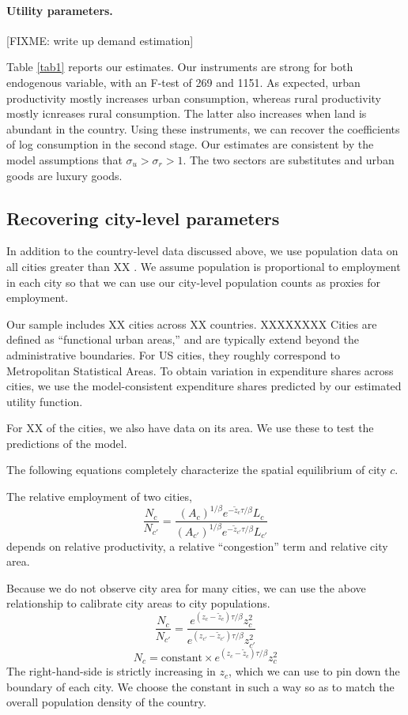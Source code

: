 \documentclass[12pt]{article}
\begin{document}
\paragraph{Utility parameters.}
[FIXME: write up demand estimation]



Table \ref{tab1} reports our estimates. Our instruments are strong for both endogenous variable, with an F-test of 269 and 1151. As expected, urban productivity mostly increases urban consumption, whereas rural productivity mostly icnreases rural consumption. The latter also increases when land is abundant in the country. Using these instruments, we can recover the coefficients of log consumption in the second stage. Our estimates are consistent by the model assumptions that $\sigma_u>\sigma_r>1$. The two sectors are substitutes and urban goods are luxury goods.

\subsection{Recovering city-level parameters}
In addition to the country-level data discussed above, we use population data on all cities greater than XX \cite{}. We assume population is proportional to employment in each city so that we can use our city-level population counts as proxies for employment. 

Our sample includes XX cities across XX countries.
XXXXXXXX Cities are defined as ``functional urban areas,'' and are typically extend beyond the administrative boundaries. For US cities, they roughly correspond to Metropolitan Statistical Areas. To obtain variation in expenditure shares across cities, we use the model-consistent expenditure shares predicted by our estimated utility function.

For XX of the cities, we also have data on its area. We use these to test the predictions of the model.

The following equations completely characterize the spatial equilibrium of city $c$.

The relative employment of two cities,
\[
\frac{N_c}{N_{c'}}
= \frac
	 {\left(A_c\right)^{1/\beta} e^{-\tilde z_c{\tau/\beta}} L_{c}}
	 {\left(A_{c'}\right)^{1/\beta} e^{-\tilde z_{c'}{\tau/\beta}} L_{c'}}
\]
depends on relative productivity, a relative ``congestion'' term and relative city area.

Because we do not observe city area for many cities, we can use the above relationship to calibrate city areas to city populations.
\[
\frac{N_c}{N_{c'}}
= \frac
	 {e^{(z_c-\tilde z_c){\tau/\beta}} z_{c}^2}
	 {e^{(z_{c'}-\tilde z_{c'}){\tau/\beta}} z_{c'}^2}
\]
\[
{N_c}
= \text{constant} \times {e^{(z_c-\tilde z_c){\tau/\beta}} z_{c}^2}
\]
The right-hand-side is strictly increasing in $z_c$, which we can use to pin down the boundary of each city. We choose the constant in such a way so as to match the overall population density of the country.
\end{document}

